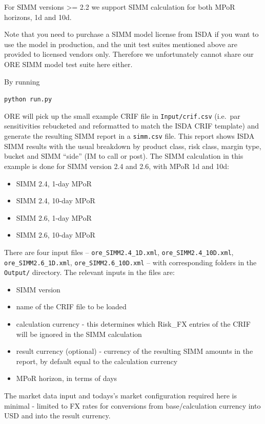 \documentclass[12pt, a4paper]{article}
\begin{document}
For SIMM versions >= 2.2 we support SIMM calculation for both MPoR horizons, 1d and 10d.
 
Note that you need to purchase a SIMM model license from ISDA if you want to use the model in production, and the unit test
suites mentioned above are provided to licensed vendors only. Therefore we unfortunately cannot share our ORE SIMM model 
test suite here either. 

By running \\
\medskip
\centerline{{\tt python run.py}} 

\medskip
ORE will pick up the small example CRIF file in {\tt Input/crif.csv} (i.e.\ par sensitivities rebucketed and reformatted to match the ISDA CRIF template) and generate the resulting SIMM report in a {\tt simm.csv} file.
This report shows ISDA SIMM results with the usual breakdown by product class, risk class, margin type, bucket and SIMM ``side'' (IM to call or post).
The SIMM calculation in this example is done for SIMM version 2.4 and 2.6, with MPoR 1d and 10d:

\begin{itemize}
  \item SIMM 2.4, 1-day MPoR
  \item SIMM 2.4, 10-day MPoR
  \item SIMM 2.6, 1-day MPoR
  \item SIMM 2.6, 10-day MPoR
\end{itemize}

\medskip
There are four input files -- {\tt ore\_SIMM2.4\_1D.xml}, {\tt ore\_SIMM2.4\_10D.xml}, {\tt ore\_SIMM2.6\_1D.xml}, {\tt ore\_SIMM2.6\_10D.xml} -- with corresponding folders in the {\tt Output/} directory.
The relevant inputs in the files are:

\begin{itemize}
\item SIMM version
\item name of the CRIF file to be loaded
\item calculation currency - this determines which Risk\_FX entries of the CRIF will be ignored in the SIMM calculation
\item result currency (optional) - currency of the resulting SIMM amounts in the report, by default equal to the calculation currency
\item MPoR horizon, in terms of days
\end{itemize}

The market data input and todays's market configuration required here is minimal - limited to FX rates for conversions from base/calculation currency into USD and into the result currency.
\end{document}
